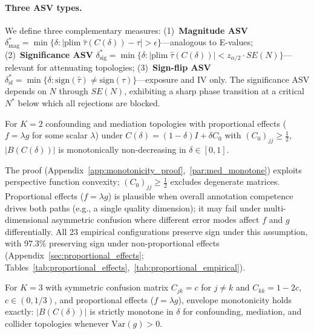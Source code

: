 \paragraph{Three ASV types.}
We define three complementary measures: (1)~\textbf{Magnitude ASV} $\delta^*_{\text{mag}} = \min\{\delta : |\text{plim}\;\hat{\tau}(C(\delta)) - \tau| > \epsilon\}$---analogous to E-values; (2)~\textbf{Significance ASV} $\delta^*_{\text{sig}} = \min\{\delta : |\text{plim}\;\hat{\tau}(C(\delta))| < z_{\alpha/2} \cdot SE(N)\}$---relevant for attenuating topologies; (3)~\textbf{Sign-flip ASV} $\delta^*_{\text{sf}} = \min\{\delta : \text{sign}(\hat{\tau}) \neq \text{sign}(\tau)\}$---exposure and IV only. The significance ASV depends on $N$ through $SE(N)$, exhibiting a sharp phase transition at a critical $N^*$ below which all rejections are blocked.

\begin{theorem}[Envelope monotonicity---$K{=}2$]
\label{thm:monotone}
For $K{=}2$ confounding and mediation topologies with proportional effects ($f = \lambda g$ for some scalar $\lambda$) under $C(\delta) = (1{-}\delta)I + \delta C_0$ with $(C_0)_{jj} \geq \tfrac{1}{2}$, $|B(C(\delta))|$ is monotonically non-decreasing in $\delta \in [0,1]$.
\end{theorem}

The proof (Appendix~\ref{app:monotonicity_proof},~\ref{par:med_monotone}) exploits perspective function convexity; $(C_0)_{jj}{\geq}\tfrac{1}{2}$ excludes degenerate matrices. Proportional effects ($f{=}\lambda g$) is plausible when overall annotation competence drives both paths (e.g., a single quality dimension); it may fail under multi-dimensional asymmetric confusion where different error modes affect $f$ and $g$ differentially. All 23 empirical configurations preserve sign under this assumption, with 97.3\% preserving sign under non-proportional effects (Appendix~\ref{sec:proportional_effects}; Tables~\ref{tab:proportional_effects},~\ref{tab:proportional_empirical}).

\begin{theorem}[$K{=}3$ symmetric monotonicity]
\label{thm:k3_symmetric}
For $K{=}3$ with symmetric confusion matrix $C_{jk} = c$ for $j \neq k$ and $C_{kk} = 1{-}2c$, $c \in (0, 1/3)$, and proportional effects ($f{=}\lambda g$), envelope monotonicity holds exactly: $|B(C(\delta))|$ is strictly monotone in $\delta$ for confounding, mediation, and collider topologies whenever $\mathrm{Var}(g) > 0$.
\end{theorem}

